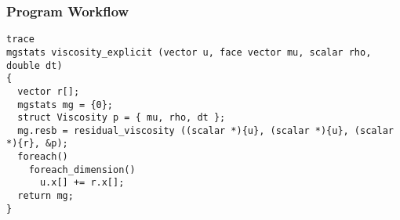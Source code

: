 \documentclass[a4paper]{article}
\newcommand{\para}[1]{\textbf{\emph{\textcolor{para}{#1}}}}
\begin{document}
\subsubsection{Program Workflow}
\begin{multicols}{2}
  \columnbreak
  \begin{verbatim}
trace
mgstats viscosity_explicit (vector u, face vector mu, scalar rho, double dt)
{
  vector r[];
  mgstats mg = {0};
  struct Viscosity p = { mu, rho, dt };
  mg.resb = residual_viscosity ((scalar *){u}, (scalar *){u}, (scalar *){r}, &p);
  foreach()
    foreach_dimension()
      u.x[] += r.x[];
  return mg;
}
  \end{verbatim}
\end{multicols}
\printbibliography
\end{document}
